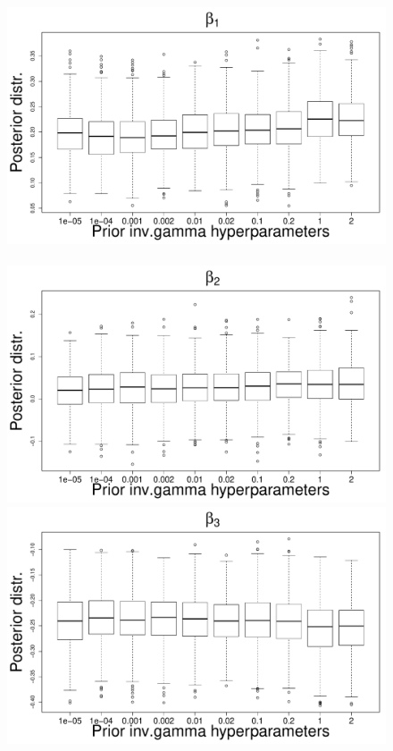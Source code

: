 \documentclass{statsoc}
\numberwithin{figure}{section}
\numberwithin{table}{section}
\begin{document}
\begin{figure}
\centering
\includegraphics[scale=0.25]{Sensitivity/beta_1_sensitivity.pdf}~
\includegraphics[scale=0.25]{Sensitivity/beta_2_sensitivity.pdf}\\
\includegraphics[scale=0.25]{Sensitivity/beta_3_sensitivity.pdf}~

\end{figure}
\end{document}
